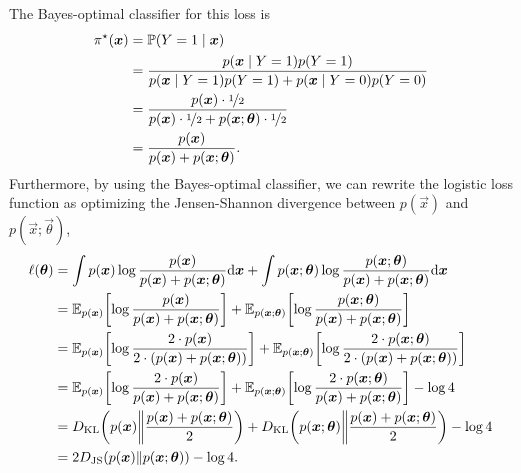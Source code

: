The Bayes-optimal classifier for this loss is
\begin{align*}
    \pi^\star(\vec{x}) & = \mathbb{P}(Y = 1 \mid \vec{x})                                                                                             \\
                       & = \frac{p(\vec{x} \mid Y = 1) p(Y=1)}{p(\vec{x} \mid Y = 1) p(Y = 1) + p(\vec{x} \mid Y = 0) p(Y = 0)}                       \\
                       & = \frac{p(\vec{x}) \cdot \nicefrac{1}{2}}{p(\vec{x}) \cdot \nicefrac{1}{2} + p(\vec{x}; \vec{\theta}) \cdot \nicefrac{1}{2}} \\
                       & = \frac{p(\vec{x})}{p(\vec{x}) + p(\vec{x}; \vec{\theta})}.
\end{align*}
Furthermore, by using the Bayes-optimal classifier, we can rewrite the logistic loss function as
optimizing the Jensen-Shannon divergence between $p(\vec{x})$ and $p(\vec{x}; \vec{\theta})$,
\begin{align*}
    \ell(\vec{\theta}) & = \int p(\vec{x}) \log \frac{p(\vec{x})}{p(\vec{x}) + p(\vec{x}; \vec{\theta})} \mathrm{d}\vec{x} + \int p(\vec{x}; \vec{\theta}) \log \frac{p(\vec{x}; \vec{\theta})}{p(\vec{x}) + p(\vec{x}; \vec{\theta})} \mathrm{d}\vec{x}                       \\
                       & = \E_{p(\vec{x})} \lft[ \log \frac{p(\vec{x})}{p(\vec{x}) + p(\vec{x}; \vec{\theta})} \rgt] + \E_{p(\vec{x}; \vec{\theta})} \lft[ \log \frac{p(\vec{x}; \vec{\theta})}{p(\vec{x}) + p(\vec{x}; \vec{\theta})} \rgt]                                   \\
                       & = \E_{p(\vec{x})} \lft[ \log \frac{2 \cdot p(\vec{x})}{2 \cdot (p(\vec{x}) + p(\vec{x}; \vec{\theta}))} \rgt] + \E_{p(\vec{x}; \vec{\theta})} \lft[ \log \frac{2\cdot p(\vec{x}; \vec{\theta})}{2\cdot (p(\vec{x}) + p(\vec{x}; \vec{\theta}))} \rgt] \\
                       & = \E_{p(\vec{x})} \lft[ \log \frac{2 \cdot p(\vec{x})}{p(\vec{x}) + p(\vec{x}; \vec{\theta})} \rgt] + \E_{p(\vec{x}; \vec{\theta})} \lft[ \log \frac{2\cdot p(\vec{x}; \vec{\theta})}{p(\vec{x}) + p(\vec{x}; \vec{\theta})} \rgt] - \log 4           \\
                       & = D_{\mathrm{KL}}\lft(p(\vec{x}) \middle\| \frac{p(\vec{x}) + p(\vec{x}; \vec{\theta})}{2} \rgt) + D_{\mathrm{KL}} \lft( p(\vec{x}; \vec{\theta}) \middle\| \frac{p(\vec{x}) + p(\vec{x}; \vec{\theta})}{2} \rgt) - \log 4                            \\
                       & = 2 D_{\mathrm{JS}}(p(\vec{x}) \| p(\vec{x}; \vec{\theta})) - \log 4.
\end{align*}


